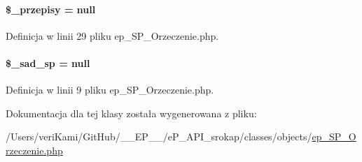 \hypertarget{classep___s_p___orzeczenie_a070b291e5f4d9685f5e035cfe91aaa7e}{
\paragraph[{\$\-\_\-przepisy}]{\setlength{\rightskip}{0pt plus 5cm}\$\-\_\-przepisy = null\hspace{0.3cm}{\ttfamily [protected]}}}\label{classep___s_p___orzeczenie_a070b291e5f4d9685f5e035cfe91aaa7e}


Definicja w linii 29 pliku ep\-\_\-\-S\-P\-\_\-\-Orzeczenie.\-php.

\hypertarget{classep___s_p___orzeczenie_a811580445f6e2ef962379396050552c6}{
\paragraph[{\$\-\_\-sad\-\_\-sp}]{\setlength{\rightskip}{0pt plus 5cm}\$\-\_\-sad\-\_\-sp = null\hspace{0.3cm}{\ttfamily [protected]}}}\label{classep___s_p___orzeczenie_a811580445f6e2ef962379396050552c6}


Definicja w linii 9 pliku ep\-\_\-\-S\-P\-\_\-\-Orzeczenie.\-php.



Dokumentacja dla tej klasy została wygenerowana z pliku\-:\begin{DoxyCompactItemize}
\item 
/\-Users/veri\-Kami/\-Git\-Hub/\-\_\-\-\_\-\-E\-P\-\_\-\-\_\-/e\-P\-\_\-\-A\-P\-I\-\_\-srokap/classes/objects/\hyperlink{ep___s_p___orzeczenie_8php}{ep\-\_\-\-S\-P\-\_\-\-Orzeczenie.\-php}\end{DoxyCompactItemize}
